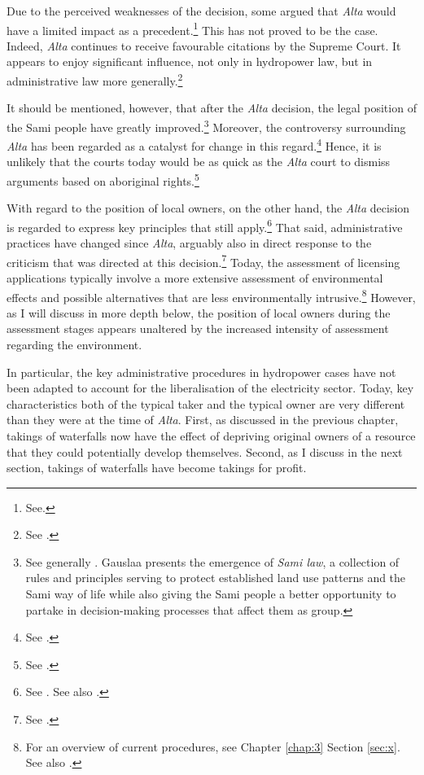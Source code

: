 Due to the perceived weaknesses of the decision, some argued that {\it Alta} would have a limited impact as a precedent.\footnote{See\cite[580-584]{backer86}.} This has not proved to be the case. Indeed, {\it Alta} continues to receive favourable citations by the Supreme Court. It appears to enjoy significant influence, not only in hydropower law, but in administrative law more generally.\footnote{See \cite{ambassade09,jorpeland11}.}

It should be mentioned, however, that after the {\it Alta} decision, the legal position of the Sami people have greatly improved.\footnote{See generally \cite{gauslaa07}. Gauslaa presents the emergence of {\it Sami law}, a collection of rules and principles serving to protect established land use patterns and the Sami way of life while also giving the Sami people a better opportunity to partake in decision-making processes that affect them as group.} Moreover, the controversy surrounding {\it Alta} has been regarded as a catalyst for change in this regard.\footnote{See \cite[156]{ravna12s}.} Hence, it is unlikely that the courts today would be as quick as the {\it Alta} court to dismiss arguments based on aboriginal rights.\footnote{See \cite[180]{gauslaa07}.}

With regard to the position of local owners, on the other hand, the {\it Alta} decision is regarded to express key principles that still apply.\footnote{See \cite{jorpeland11}. See also \cite[312]{haagensen02}.} That said, administrative practices have changed since {\it Alta}, arguably also in direct response to the criticism that was directed at this decision.\footnote{See \cite[122-123]{backer10}.} Today, the assessment of licensing applications typically involve a more extensive assessment of environmental effects and possible alternatives that are less environmentally intrusive.\footnote{For an overview of current procedures, see Chapter \ref{chap:3} Section \ref{sec:x}. See also \cite[625-659]{backer86}.} However, as I will discuss in more depth below, the position of local owners during the assessment stages appears unaltered by the increased intensity of assessment regarding the environment. 

In particular, the key administrative procedures in hydropower cases have not been adapted to account for the liberalisation of the electricity sector. Today, key characteristics both of the typical taker and the typical owner are very different than they were at the time of {\it Alta}. First, as discussed in the previous chapter, takings of waterfalls now have the effect of depriving original owners of a resource that they could potentially develop themselves. Second, as I discuss in the next section, takings of waterfalls have become takings for profit.

